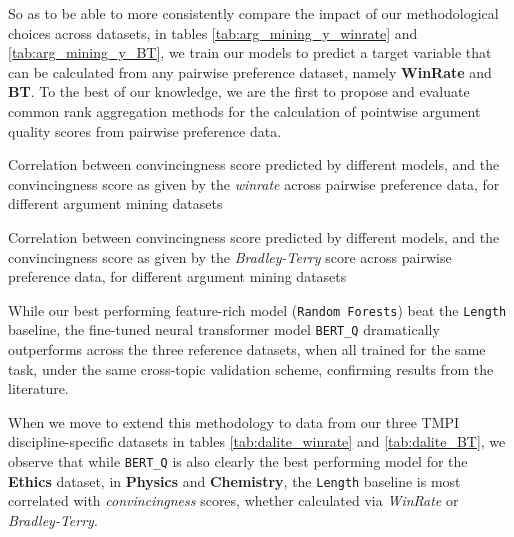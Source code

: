 \documentclass[notitlepage,12pt]{jedm}
\begin{document}
So as to be able to more consistently compare the impact of our methodological 
choices across datasets, in tables \ref{tab:arg_mining_y_winrate} and 
\ref{tab:arg_mining_y_BT}, we 
train our models to predict a target variable that can be calculated from any 
pairwise preference dataset, namely \textbf{WinRate} and \textbf{BT}.
To the best of our knowledge, we are the first to propose and evaluate common 
rank aggregation methods for the calculation of pointwise argument quality 
scores from pairwise preference data.

\begin{table}
	\parbox{.45\linewidth}{
		\centering
		
	}
	\hfill
	\parbox{.45\linewidth}{
		\centering
		
	}
	\caption{Correlation between convincingness score predicted by 
		different models, and the convincingness score as given by the 
		\textit{winrate} across pairwise preference data, for different 
		argument mining datasets
	}
	\label{tab:arg_mining_y_winrate}
\end{table}


\begin{table}
	\parbox{.45\linewidth}{
		\centering
		
	}
	\hfill
	\parbox{.45\linewidth}{
		\centering
		
	}
	\caption{Correlation between convincingness score predicted by 
		different models, and the convincingness score as given by the 
		\textit{Bradley-Terry} score across pairwise preference data, for 
		different 
		argument mining datasets
	}
	\label{tab:arg_mining_y_BT}
\end{table}

While our best performing feature-rich model (\verb|Random Forests|) beat the 
\verb|Length| baseline, the fine-tuned neural transformer model \verb|BERT_Q| 
dramatically outperforms across the three reference datasets, when all trained 
for the same task, under the same cross-topic validation scheme, confirming 
results from the literature.

When we move to extend this methodology to data from our three TMPI 
discipline-specific datasets in tables \ref{tab:dalite_winrate} and 
\ref{tab:dalite_BT}, we observe that while \verb|BERT_Q| is also clearly the 
best performing model for the \textbf{Ethics} dataset, in \textbf{Physics} and 
\textbf{Chemistry}, the \verb|Length| baseline is most correlated with 
\textit{convincingness} scores, whether calculated via \textit{WinRate} or 
\textit{Bradley-Terry}.
\end{document}
